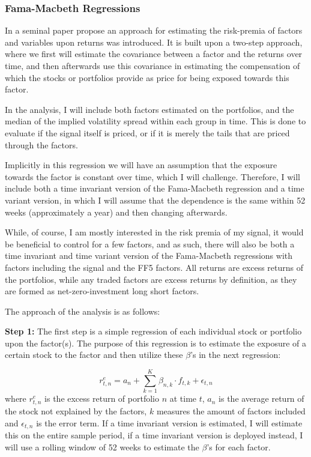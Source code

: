 \subsubsection{Fama-Macbeth Regressions}

In a seminal paper \cite{fama1973risk} propose an approach for estimating the risk-premia of factors and variables upon returns was introduced. It is built upon a two-step approach, where we first will estimate the covariance between a factor and the returns over time, and then afterwards use this covariance in estimating the compensation of which the stocks or portfolios provide as price for being exposed towards this factor. 

In the analysis, I will include both factors estimated on the portfolios, and the median of the implied volatility spread within each group in time. This is done to evaluate if the signal itself is priced, or if it is merely the tails that are priced through the factors.

Implicitly in this regression we will have an assumption that the exposure towards the factor is constant over time, which I will challenge. Therefore, I will include both a time invariant version of the Fama-Macbeth regression and a time variant version, in which I will assume that the dependence is the same within 52 weeks (approximately a year) and then changing afterwards. 

While, of course, I am mostly interested in the risk premia of my signal, it would be beneficial to control for a few factors, and as such, there will also be both a time invariant and time variant version of the Fama-Macbeth regressions with factors including the signal and the FF5 factors. All returns are excess returns of the portfolios, while any traded factors are excess returns by definition, as they are formed as net-zero-investment long short factors. 

The approach of the analysis is as follows:

\textbf{Step 1:} The first step is a simple regression of each individual stock or portfolio upon the factor(s). The purpose of this regression is to estimate the exposure of a certain stock to the factor and then utilize these $\beta$'s in the next regression:

\begin{equation}
	r_{t,n}^{e}=a_{n}+\sum_{k=1}^{K}\beta_{n,k}\cdot f_{t,k}+\epsilon_{t,n}
	\label{eq:fm1}
\end{equation}
where $r_{t,n}^{e}$ is the excess return of portfolio $n$ at time $t$, $a_{n}$ is the average return of the stock not explained by the factors, $k$ measures the amount of factors included and $\epsilon_{t,n}$ is the error term. If a time invariant version is estimated, I will estimate this on the entire sample period, if a time invariant version is deployed instead, I will use a rolling window of 52 weeks to estimate the $\beta$'s for each factor.

